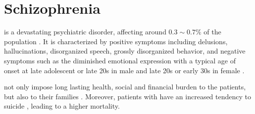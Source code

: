 
	\section{Schizophrenia}
	 is a devastating psychiatric disorder, affecting around $0.3\sim0.7\%$ of the population \citep{AmericanPsychiatricAssociation2013}.
	It is characterized by positive symptoms including delusions, hallucinations, disorganized speech, grossly disorganized behavior, and negative symptoms such as the diminished emotional expression \citep{AmericanPsychiatricAssociation2013} with a typical age of onset at late adolescent or late 20s in male and late 20s or early 30s in female \citep{Schultz2007}.
	
	 not only impose long lasting health, social and financial burden to the patients, but also to their families \citep{Knapp2004}. 
	Moreover, patients with  have an increased tendency to suicide \citep{Saha2007}, leading to a higher mortality.
